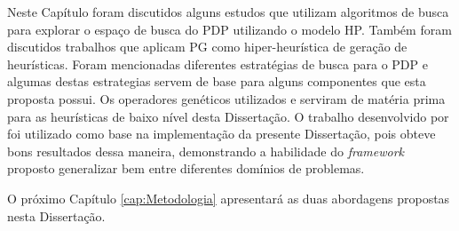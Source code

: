 Neste Capítulo foram discutidos alguns estudos que utilizam algoritmos de busca para explorar o espaço de busca do PDP utilizando o modelo HP. Também foram discutidos trabalhos que aplicam PG como hiper-heurística de geração de heurísticas. Foram mencionadas diferentes estratégias de busca para o PDP e algumas destas estrategias servem de base para alguns componentes que esta proposta possui. Os operadores genéticos utilizados \cite{custodio2014multiple} e \cite{lin2011protein} serviram de matéria prima para as heurísticas de baixo nível desta Dissertação. O trabalho desenvolvido por \cite{sabar2015automatic} foi utilizado como base na implementação da presente Dissertação, pois obteve bons resultados dessa maneira, demonstrando a habilidade do \textit{framework} proposto generalizar bem entre diferentes domínios de problemas.

O próximo Capítulo \ref{cap:Metodologia} apresentará as duas abordagens propostas nesta Dissertação. 
